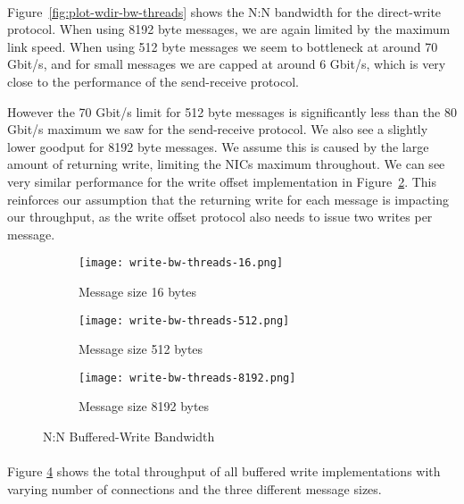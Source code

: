 \paragraph{} Figure~\ref{fig:plot-wdir-bw-threads} shows the N:N bandwidth for the direct-write protocol. When using 8192 
byte messages, we are again limited by the maximum link speed. When using 512 byte messages we seem to bottleneck at around 
70 Gbit/s, and for small messages we are capped at around 6 Gbit/s, which is very close to the performance of the send-receive
protocol.

However the 70 Gbit/s limit for 512 byte messages is significantly less than the 80 Gbit/s maximum we saw for the
send-receive protocol. We also see a slightly lower goodput for 8192 byte messages. We assume this is caused by the 
large amount of returning write, limiting the NICs maximum throughout. We can see very similar performance for the
write offset implementation in Figure~\ref{fig:plot-write-bw-thread-512}. This reinforces our assumption that the returning write
for each message is impacting our throughput, as the write offset protocol also needs to issue two writes per message.




\begin{figure}[ht]
  \centering
\begin{subfigure}[b]{0.49\textwidth}
  \centering
  \texttt{[image: write-bw-threads-16.png]}
  \caption{Message size 16 bytes}
  \label{fig:plot-write-bw-thread-16}
\end{subfigure}
\begin{subfigure}[b]{0.49\textwidth}
  \centering
  \texttt{[image: write-bw-threads-512.png]}
  \caption{Message size 512 bytes}
  \label{fig:plot-write-bw-thread-512}
\end{subfigure}
\begin{subfigure}[b]{0.49\textwidth}
  \centering
  \texttt{[image: write-bw-threads-8192.png]}
  \caption{Message size 8192 bytes}
  \label{fig:plot-write-bw-thread-8192}
\end{subfigure}
  \caption{N:N Buffered-Write Bandwidth}
  \label{fig:plot-write-bw-thread}
\end{figure}


\paragraph{} Figure \ref{fig:plot-write-bw-thread} shows the total throughput of all buffered write implementations
with varying number of connections and the three different message sizes.

